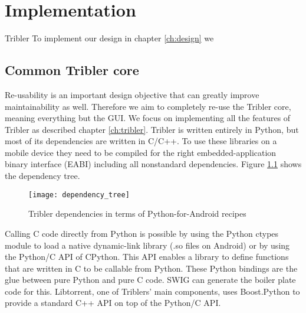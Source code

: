 \chapter{Implementation}
\label{ch:implementation}

Tribler 
To implement our design in chapter \ref{ch:design} we

\section{Common Tribler core}
Re-usability is an important design objective that can greatly improve maintainability as well.
Therefore we aim to completely re-use the Tribler core, meaning everything but the GUI.
We focus on implementing all the features of Tribler as described chapter \ref{ch:tribler}.
Tribler is written entirely in Python, but most of its dependencies are written in C/C++.
To use these libraries on a mobile device they need to be compiled for the right embedded-application binary interface (EABI) including all nonstandard dependencies.
Figure \ref{fig:dependency_tree} shows the dependency tree.

\begin{figure}[H]
	\centering
	\texttt{[image: dependency\_tree]}
	\caption{Tribler dependencies in terms of Python-for-Android recipes}
	\label{fig:dependency_tree}
\end{figure}

Calling C code directly from Python is possible by using the Python ctypes module to load a native dynamic-link library (.so files on Android) or by using the Python/C API of CPython.
This API enables a library to define functions that are written in C to be callable from Python.
These Python bindings are the glue between pure Python and pure C code.
SWIG can generate the boiler plate code for this.
Libtorrent, one of Triblers' main components, uses Boost.Python to provide a standard C++ API on top of the Python/C API.

